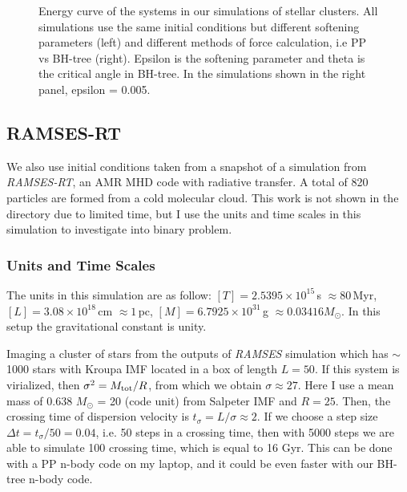 \begin{figure}
\begin{subfigure}[b]{0.48\textwidth}
		\label{fig:energycompareppbh}
	\end{subfigure}
	\caption{Energy curve of the systems in our simulations of stellar clusters. All 
	simulations use the same initial conditions but different softening parameters (left) 
	and different methods of force calculation, i.e PP vs BH-tree (right). Epsilon is the 
	softening parameter and theta is the critical angle in BH-tree. In the simulations shown 
	in the right panel, epsilon = 0.005.}
	\label{fig:energy}
\end{figure}


\subsection*{RAMSES-RT}
We also use initial conditions taken from a snapshot of a simulation from 
\textit{RAMSES-RT}, an AMR MHD code with radiative transfer. A total of 820 particles are 
formed from a cold molecular cloud. This work is not shown in the directory due to limited 
time, but I use the units and time scales in this simulation to investigate into binary 
problem. 

\subsubsection*{Units and Time Scales}
The units in this simulation are as follow: $ [T] = 2.5395 \times 10^{15}\,$s $\approx 
80\,$Myr, $ [L] = 3.08 \times 10^{18} \, $cm $ \approx 1 \, $pc, $ [M] = 6.7925 \times 
10^{31} \, $g $ \approx 0.03416 M_\odot $. In this setup the gravitational constant is unity. 

Imaging a cluster of stars from the outputs of \textit{RAMSES} simulation which has $ \sim 
$ 1000 stars with Kroupa IMF located in a box of length $ L = 50 $. If this system is 
virialized, then $ \sigma^2 = M_{\rm tot} / R $, from which we obtain $ \sigma \approx 
27 $. Here I use a mean mass of 0.638 $ M_\odot $ = 20 (code unit) from Salpeter IMF and 
$ R = 25 $.
Then, the crossing time of dispersion velocity is $ t_{\sigma} = L / \sigma \approx 2 $.
If we choose a step size $ \Delta t  = t_\sigma / 50 = 0.04 $, i.e. 50 steps in a crossing time, 
then with 5000 steps we are able to simulate 100 crossing time, which is equal to 16 Gyr. 
This can be done with a PP n-body code on my laptop, and it could be even faster with our 
BH-tree n-body code.

